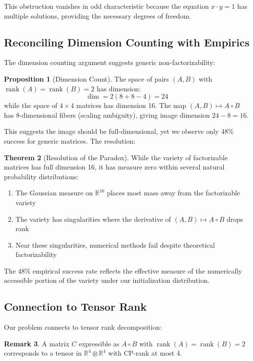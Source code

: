 \documentclass{article}
\theoremstyle{definition}
\newtheorem{theorem}{Theorem}
\newtheorem{proposition}[theorem]{Proposition}
\newtheorem{remark}[theorem]{Remark}
\DeclareMathOperator{\rank}{rank}
\begin{document}
This obstruction vanishes in odd characteristic because the equation $x \cdot y = 1$ has multiple solutions, providing the necessary degrees of freedom.

\subsection{Reconciling Dimension Counting with Empirics}

The dimension counting argument \cite{mathoverflow2024} suggests generic non-factorizability:

\begin{proposition}[Dimension Count]
The space of pairs $(A,B)$ with $\rank(A) = \rank(B) = 2$ has dimension:
\[
\dim = 2(8 + 8 - 4) = 24
\]
while the space of $4 \times 4$ matrices has dimension 16. The map $(A,B) \mapsto A \circ B$ has 8-dimensional fibers (scaling ambiguity), giving image dimension $24 - 8 = 16$.
\end{proposition}

This suggests the image should be full-dimensional, yet we observe only 48\% success for generic matrices. The resolution:

\begin{theorem}[Resolution of the Paradox]
While the variety of factorizable matrices has full dimension 16, it has measure zero within several natural probability distributions:
\begin{enumerate}
\item The Gaussian measure on $\mathbb{R}^{16}$ places most mass away from the factorizable variety
\item The variety has singularities where the derivative of $(A,B) \mapsto A \circ B$ drops rank
\item Near these singularities, numerical methods fail despite theoretical factorizability
\end{enumerate}
\end{theorem}

The 48\% empirical success rate reflects the effective measure of the numerically accessible portion of the variety under our initialization distribution.

\subsection{Connection to Tensor Rank}

Our problem connects to tensor rank decomposition:

\begin{remark}
A matrix $C$ expressible as $A \circ B$ with $\rank(A) = \rank(B) = 2$ corresponds to a tensor in $\mathbb{R}^4 \otimes \mathbb{R}^4$ with CP-rank \cite{kolda2009tensor} at most 4.
\end{remark}
\end{document}

